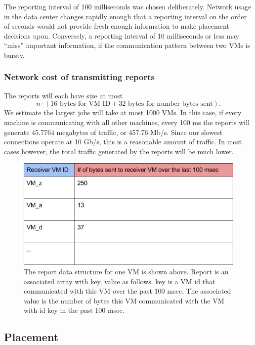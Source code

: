 \documentclass[11pt]{article}
\begin{document}
The reporting interval of 100 milliseconds was chosen deliberately.  Network usage in the data center changes rapidly enough that a reporting interval on the order of seconds would not provide fresh enough information to make placement decisions upon.  Conversely, a reporting interval of 10 milliseconds or less may ``miss'' important information, if the communication pattern between two VMs is bursty.

\subsubsection{Network cost of transmitting reports}
The reports will each have size at most
\[ n \cdot ( 16 \text{ bytes for VM ID} + 32 \text{ bytes for number bytes sent}). \]
We estimate the largest jobs will take at most 1000 VMs.  In this case, if every machine is communicating with all other machines, every 100 ms the reports will generate 45.7764 megabytes of traffic, or 457.76 Mb/s.  Since our slowest connections operate at 10 Gb/s, this is a reasonable amount of traffic.  In most cases however, the total traffic generated by the reports will be much lower.

\begin{figure}
  \centering
\includegraphics[scale=0.65]{measurement.png}

 \caption{The report data structure for one VM is shown above. Report is an associated array with key, value as follows. key is a VM id that communicated with this VM over the past 100 msec. The associated value is the number of bytes this VM communicated with the VM with id key in the past 100 msec.}
 
 \label{fig:report}
\end{figure}

\subsection{Placement}
\end{document}
